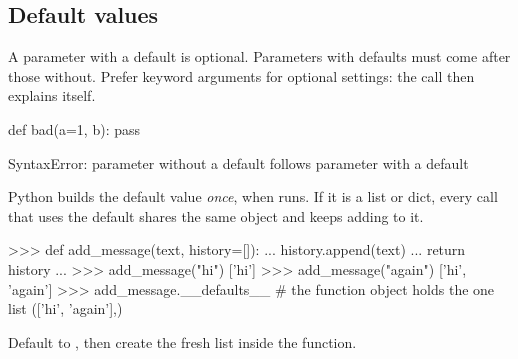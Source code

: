\subsection{Default values}

A parameter with a default is optional. Parameters with defaults must come after those without.
Prefer keyword arguments for optional settings: the call then explains itself.

\begin{pycode}
def bad(a=1, b):
    pass
\end{pycode}
\begin{rawcode}
SyntaxError: parameter without a default follows parameter with a default
\end{rawcode}

\begin{trap}
Python builds the default value \emph{once}, when  runs. If it is a list or dict, every
call that uses the default shares the same object and keeps adding to it.
\end{trap}

\begin{center}
\end{center}

\begin{pycode}
>>> def add_message(text, history=[]):
...     history.append(text)
...     return history
...
>>> add_message("hi")
['hi']
>>> add_message("again")
['hi', 'again']
>>> add_message.__defaults__      # the function object holds the one list
(['hi', 'again'],)
\end{pycode}

\begin{gamerule}
Default to , then create the fresh list inside the function.
\end{gamerule}

